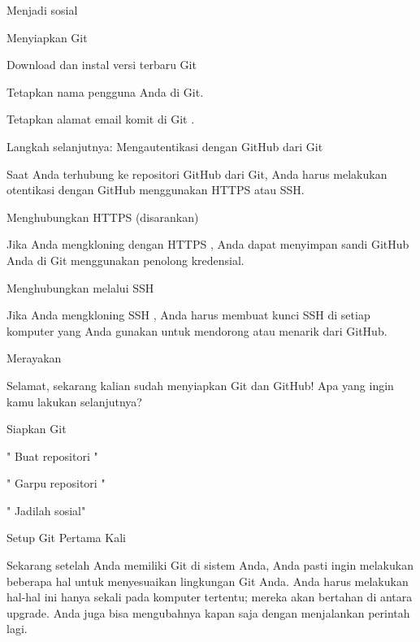 \noindent 
Menjadi sosial \par
\noindent 
Menyiapkan Git \par
\noindent 
Download dan instal versi terbaru Git \par
\noindent 
Tetapkan nama pengguna Anda di Git. \par
\noindent 
Tetapkan alamat email komit di Git $  $. \par
\noindent 
Langkah selanjutnya: Mengautentikasi dengan GitHub dari Git \par
\noindent 
Saat Anda terhubung ke repositori GitHub dari Git, Anda harus melakukan otentikasi dengan GitHub menggunakan HTTPS atau SSH. \par
\noindent 
Menghubungkan HTTPS (disarankan) \par
\noindent 
Jika Anda $  $mengkloning dengan HTTPS $  $, Anda dapat $  $menyimpan sandi GitHub Anda di Git menggunakan penolong kredensial. \par
\vspace{12pt}
\noindent 
Menghubungkan melalui SSH \par
\vspace{12pt}
\noindent 
Jika Anda $  $mengkloning SSH $  $, Anda harus $  $membuat kunci SSH $  $di setiap komputer yang Anda gunakan untuk mendorong atau menarik dari GitHub. \par
\vspace{12pt}
\noindent 
Merayakan \par
\vspace{12pt}
\noindent 
Selamat, sekarang kalian sudah menyiapkan Git dan GitHub! $  $Apa yang ingin kamu lakukan selanjutnya? \par
\vspace{12pt}
\noindent 
Siapkan Git \par
\noindent 
" $  $Buat repositori $  $" \par
\noindent 
" $  $Garpu repositori $  $" \par
\noindent 
" $  $Jadilah sosial" \par
\vspace{12pt}
\noindent 
Setup Git Pertama Kali \par
\vspace{12pt}
\noindent 
Sekarang setelah Anda memiliki Git di sistem Anda, Anda pasti ingin melakukan beberapa hal untuk menyesuaikan lingkungan Git Anda. $  $Anda harus melakukan hal-hal ini hanya sekali pada komputer tertentu; $  $mereka akan bertahan di antara upgrade. $  $Anda juga bisa mengubahnya kapan saja dengan menjalankan perintah lagi. \par
